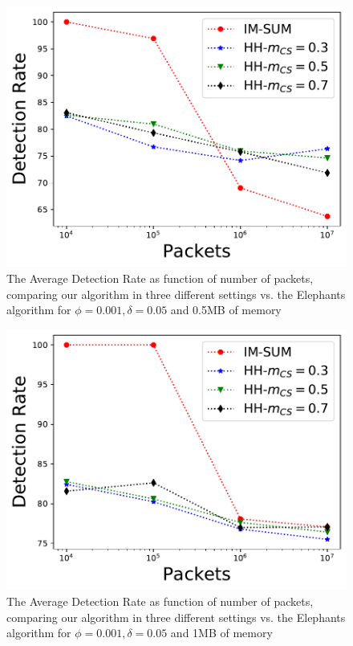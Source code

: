 \begin{figure}     \centering
    \includegraphics[width=\linewidth]{HH/figures/DR_per_pkts_m=0.5.pdf}
\caption[Average Detection Rate for 0.5MB of memory]{The Average Detection Rate as function of number of packets, comparing our algorithm in three different settings vs. the Elephants algorithm for $\phi=0.001,\delta=0.05$ and 0.5MB of memory}
    \label{fig:fig2_e}
\end{figure}

\begin{figure}     \centering
    \includegraphics[width=\linewidth]{HH/figures/DR_per_pkts_m=1.0.pdf}
\caption[Average Detection Rate for 1MB of memory]{The Average Detection Rate as function of number of packets, comparing our algorithm in three different settings vs. the Elephants algorithm for $\phi=0.001,\delta=0.05$ and 1MB of memory}
    \label{fig:fig2_f}
\end{figure}


